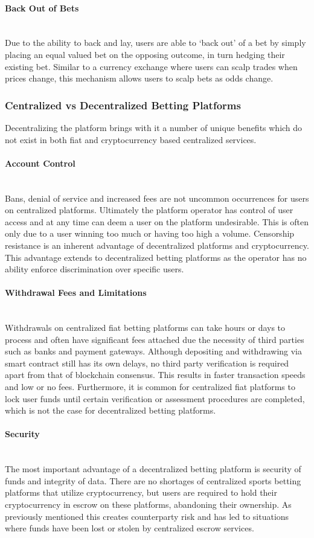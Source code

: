 \documentclass{article}
\newcommand{\myparagraph}[1]{\paragraph{#1}\mbox{}\\ \newline}
\begin{document}
				\myparagraph{Back Out of Bets}
Due to the ability to back and lay, users are able to ‘back out’ of a bet by simply placing an equal valued bet on the opposing outcome, in turn hedging their existing bet. Similar to a currency exchange where users can scalp trades when prices change, this mechanism allows users to scalp bets as odds change.

			\subsubsection{Centralized vs Decentralized Betting Platforms}
Decentralizing the platform brings with it a number of unique benefits which do not exist in both fiat and cryptocurrency based centralized services.

				\myparagraph{Account Control}
Bans, denial of service and increased fees are not uncommon occurrences for users on centralized platforms. Ultimately the platform operator has control of user access and at any time can deem a user on the platform undesirable. This is often only due to a user winning too much or having too high a volume. Censorship resistance is an inherent advantage of decentralized platforms and cryptocurrency. This advantage extends to decentralized betting platforms as the operator has no ability enforce discrimination over specific users.

				\myparagraph{Withdrawal Fees and Limitations}
Withdrawals on centralized fiat betting platforms can take hours or days to process and often have significant fees attached due the necessity of third parties such as banks and payment gateways. Although depositing and withdrawing via smart contract still has its own delays, no third party verification is required apart from that of blockchain consensus. This results in faster transaction speeds and low or no fees. Furthermore, it is common for centralized fiat platforms to lock user funds until certain verification or assessment procedures are completed, which is not the case for decentralized betting platforms.

				\myparagraph{Security}
The most important advantage of a decentralized betting platform is security of funds and integrity of data. There are no shortages of centralized sports betting platforms that utilize cryptocurrency, but users are required to hold their cryptocurrency in escrow on these platforms, abandoning their ownership. As previously mentioned this creates counterparty risk and has led to situations where funds have been lost or stolen by centralized escrow services.
\end{document}
